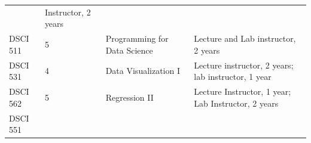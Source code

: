 \documentclass[]{article}
\begin{document}
\begin{longtable}[]{@{}llll@{}}
\begin{minipage}[t]{0.13\columnwidth}
\end{minipage} & \begin{minipage}[t]{0.25\columnwidth}\raggedright
Instructor, 2 years\strut
\end{minipage}\tabularnewline
\begin{minipage}[t]{0.21\columnwidth}\raggedright
DSCI 511\strut
\end{minipage} & \begin{minipage}[t]{0.29\columnwidth}\raggedright
5\strut
\end{minipage} & \begin{minipage}[t]{0.13\columnwidth}\raggedright
Programming for Data Science\strut
\end{minipage} & \begin{minipage}[t]{0.25\columnwidth}\raggedright
Lecture and Lab instructor, 2 years\strut
\end{minipage}\tabularnewline
\begin{minipage}[t]{0.21\columnwidth}\raggedright
DSCI 531\strut
\end{minipage} & \begin{minipage}[t]{0.29\columnwidth}\raggedright
4\strut
\end{minipage} & \begin{minipage}[t]{0.13\columnwidth}\raggedright
Data Visualization I\strut
\end{minipage} & \begin{minipage}[t]{0.25\columnwidth}\raggedright
Lecture instructor, 2 years; lab instructor, 1 year\strut
\end{minipage}\tabularnewline
\begin{minipage}[t]{0.21\columnwidth}\raggedright
DSCI 562\strut
\end{minipage} & \begin{minipage}[t]{0.29\columnwidth}\raggedright
5\strut
\end{minipage} & \begin{minipage}[t]{0.13\columnwidth}\raggedright
Regression II\strut
\end{minipage} & \begin{minipage}[t]{0.25\columnwidth}\raggedright
Lecture Instructor, 1 year; Lab Instructor, 2 years\strut
\end{minipage}\tabularnewline
\begin{minipage}[t]{0.21\columnwidth}\raggedright
DSCI 551\strut
\end{minipage} & \begin{minipage}[t]{0.29\columnwidth}\raggedright

\end{minipage}
\end{longtable}
\end{document}
